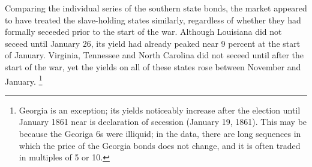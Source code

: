 \documentclass[11pt, oneside, article]{memoir}\usepackage[]{graphicx}\usepackage[]{color}
\begin{document}
Comparing the individual series of the southern state bonds, the market appeared to have treated the slave-holding states similarly, regardless of whether they had formally seceeded prior to the start of the war.
Although Louisiana did not seceed until January 26, its yield had already peaked near 9 percent at the start of January.
Virginia, Tennessee and North Carolina did not seceed until after the start of the war, yet the yields on all of these states rose between November and January.%
\footnote{Georgia is an exception; its yields noticeably increase after the election until January 1861 near is declaration of secession (January 19, 1861).
This may be because the Georiga 6s were illiquid; in the data, there are long sequences in which the price of the Georgia bonds does not change, and it is often traded in multiples of 5 or 10.
}
\end{document}
